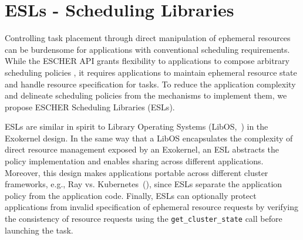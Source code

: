 \section{ESLs - \name{} Scheduling Libraries}   %
\label{sec:esl}

Controlling task placement through direct manipulation of ephemeral resources can be burdensome for applications with conventional scheduling requirements. While the ESCHER API grants flexibility to applications to compose arbitrary scheduling policies
, it requires applications to maintain ephemeral resource state and handle resource specification for tasks. %
To reduce the application complexity and delineate scheduling policies from the mechanisms to implement them, we propose ESCHER Scheduling Libraries (ESLs).

ESLs are similar in spirit to Library Operating Systems (LibOS,~\cite{Kaashoek:1997:APF:268998.266644}) in the Exokernel\cite{exokernel} design.
In the same way that a LibOS encapsulates the complexity of direct resource management exposed by an Exokernel, an ESL abstracts the policy implementation and enables sharing across different \name{} applications.
Moreover, this design makes applications portable across different cluster frameworks, e.g., Ray vs. Kubernetes~(), since ESLs separate the application policy from the application code.
Finally, ESLs can optionally protect applications from invalid specification of ephemeral resource requests by verifying the consistency of resource requests using the \lstinline{get_cluster_state} call before launching the task.

